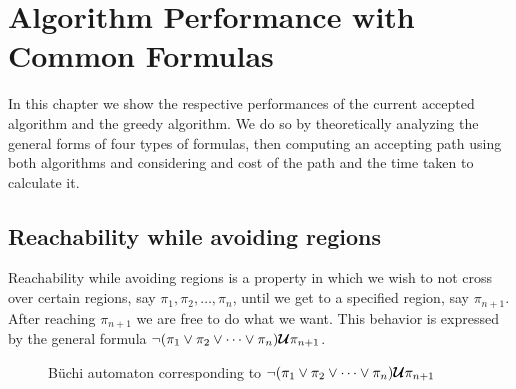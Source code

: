 \chapter{Algorithm Performance with Common Formulas}
In this chapter we show the respective performances of the current accepted algorithm and the greedy algorithm. We do so by theoretically analyzing the general forms of four types of formulas, then computing an accepting path using both algorithms and considering and cost of the path and the time taken to calculate it.%




\section{Reachability while avoiding regions} 
Reachability while avoiding regions is a property in which we wish to not cross over certain regions, say $\pi_1, \pi_2, \dots, \pi_n$, until we get to a specified region, say $\pi_{n+1}$. After reaching $\pi_{n+1}$ we are free to do what we want. This behavior is expressed by the general formula $\neg (\pi_1 \lor \pi_2 \lor \dots \lor \pi_n) \bm{\mathcal{U}} \pi_{n+1}$. 

\begin{figure}
\centering
{}
\caption{B\"{u}chi automaton corresponding to $\neg (\pi_1 \lor \pi_2 \lor \dots \lor \pi_n) \bm{\mathcal{U}} \pi_{n+1}$}
\label{fig:ReachAvoid}
\end{figure}

